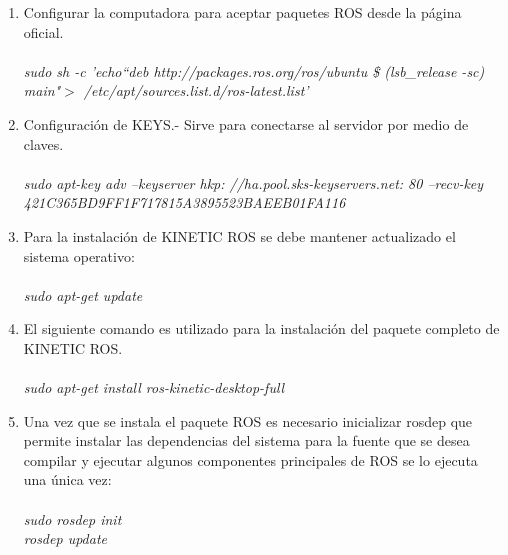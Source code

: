 \documentclass[12pt,a4paper]{article}
\begin{document}
\begin{enumerate}
\item Configurar la computadora para aceptar paquetes ROS desde la página oficial.
\\\\
\textit{sudo sh -c 'echo``deb http://packages.ros.org/ros/ubuntu \$ (lsb\_release -sc) main"$>$ /etc/apt/sources.list.d/ros-latest.list'}


\item Configuración de KEYS.- Sirve para conectarse al servidor por medio de claves.\\\\
\textit{sudo apt-key adv --keyserver hkp: //ha.pool.sks-keyservers.net: 80 --recv-key 421C365BD9FF1F717815A3895523BAEEB01FA116}

\item Para la instalación de KINETIC ROS se debe mantener actualizado el sistema operativo:\\\\
\textit{sudo apt-get update}

\item El siguiente comando es utilizado para la instalación del paquete completo de KINETIC ROS.\\\\
\textit{sudo apt-get install ros-kinetic-desktop-full}


\item Una vez que se instala el paquete ROS es necesario inicializar rosdep que permite instalar las dependencias del sistema para la fuente que se desea compilar y ejecutar algunos componentes principales de ROS se lo ejecuta una única vez:\\\\
\textit{sudo rosdep init}\\
\textit{rosdep update}
 

\end{enumerate}
\end{document}
